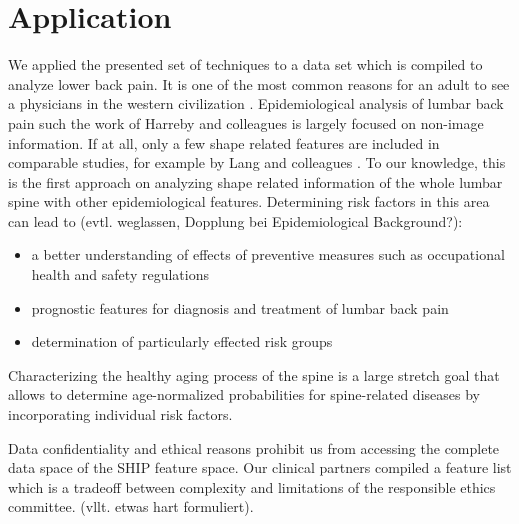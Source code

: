 \documentclass[journal]{style/vgtc} 			          %
\begin{document}
\section{Application}
We applied the presented set of techniques to a data set which is compiled to analyze lower back pain. 
%
It is one of the most common reasons for an adult to see a physicians in the western civilization \cite{Backpain}.
%
Epidemiological analysis of lumbar back pain such the work of Harreby and colleagues \cite{Harreby1996} is largely focused on non-image information.
%
If at all, only a few shape related features are included in comparable studies, for example by Lang and colleagues \cite{Lang2011}.
%
To our knowledge, this is the first approach on analyzing shape related information of the whole lumbar spine with other epidemiological features.
%
Determining risk factors in this area can lead to \cite{Fletcher2012} (evtl. weglassen, Dopplung bei Epidemiological Background?):
\begin{itemize}
	\item a better understanding of effects of preventive measures such as occupational health and safety regulations
	\item prognostic features for diagnosis and treatment of lumbar back pain
	\item determination of particularly effected risk groups
\end{itemize}
%
Characterizing the healthy aging process of the spine is a large stretch goal that allows to determine age-normalized probabilities for spine-related diseases by incorporating individual risk factors.

Data confidentiality and ethical reasons prohibit us from accessing the complete data space of the SHIP feature space.
%
Our clinical partners compiled a feature list which is a tradeoff between complexity and limitations of the responsible ethics committee. (vllt. etwas hart formuliert).
%
%
\end{document}
